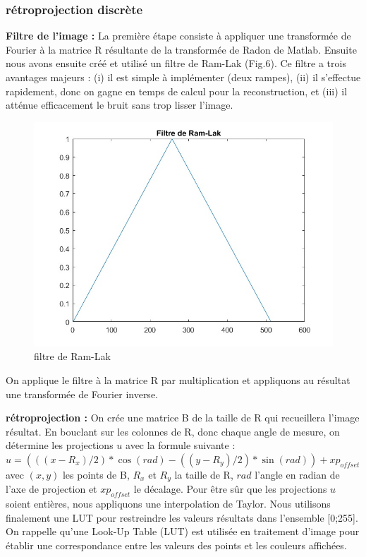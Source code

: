 \documentclass[conference]{IEEEtran}
\begin{document}
\subsubsection{rétroprojection discrète }

\textbf{Filtre de l'image :} La première étape consiste à appliquer une transformée de Fourier à la matrice R résultante de la transformée de Radon de Matlab. Ensuite nous avons ensuite créé et utilisé un filtre de Ram-Lak (Fig.6). Ce filtre a trois avantages majeurs : (i) il est simple à implémenter (deux rampes), (ii) il s'effectue rapidement, donc on gagne en temps de calcul pour la reconstruction, et (iii) il atténue efficacement le bruit sans trop lisser l'image.

\begin{figure}[H]
\centering
\includegraphics[scale=0.4]{filtre-de-Ram-Lak}
\caption[filtre de Ram-Lak]{filtre de Ram-Lak}
\label{fig:gallery}
\end{figure}

On applique le filtre à la matrice R par multiplication et appliquons au résultat une transformée de Fourier inverse.

\textbf{rétroprojection :} On crée une matrice B de la taille de R qui recueillera l'image résultat. En bouclant sur les colonnes de R, donc chaque angle de mesure, on détermine les projections $u$ avec la formule suivante :
$u=(((x-R_x)/2)*\cos(rad)-((y-R_y)/2)*\sin(rad))+xp_{offset}$
avec $(x,y)$ les points de B, $R_x$ et $R_y$ la taille de R, $rad$ l'angle en radian de l'axe de projection et $xp_{offset}$ le décalage.
Pour être sûr que les projections $u$ soient entières, nous appliquons une interpolation de Taylor.
Nous utilisons finalement une LUT pour restreindre les valeurs résultats dans l'ensemble [0;255].
On rappelle qu'une Look-Up Table (LUT) est utilisée en traitement d'image pour établir une correspondance entre les valeurs des points et les couleurs affichées.
\end{document}
